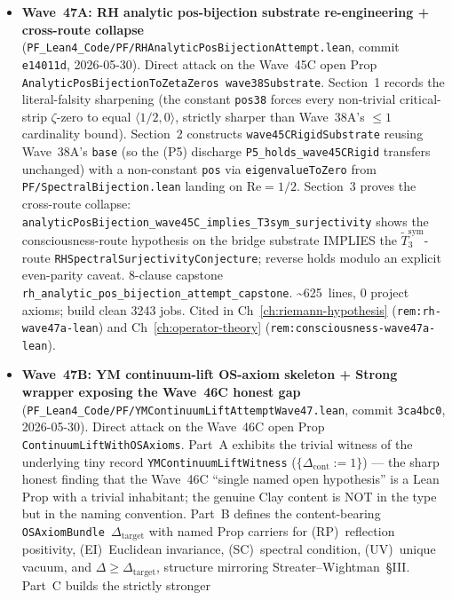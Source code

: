 \begin{itemize}
\item \textbf{Wave~47A: RH analytic pos-bijection substrate
  re-engineering + cross-route collapse}
  (\texttt{PF\_Lean4\_Code/PF/RHAnalyticPosBijectionAttempt.lean},
  commit \texttt{e14011d}, 2026-05-30). Direct attack on the
  Wave~45C open Prop \texttt{AnalyticPosBijectionToZetaZeros
  wave38Substrate}. Section~1 records the literal-falsity
  sharpening (the constant \texttt{pos38} forces every non-trivial
  critical-strip $\zeta$-zero to equal $\langle 1/2, 0\rangle$,
  strictly sharper than Wave~38A's $\leq 1$ cardinality bound).
  Section~2 constructs \texttt{wave45CRigidSubstrate} reusing
  Wave~38A's \texttt{base} (so the (P5) discharge
  \texttt{P5\_holds\_wave45CRigid} transfers unchanged) with a
  non-constant \texttt{pos} via \texttt{eigenvalueToZero} from
  \texttt{PF/SpectralBijection.lean} landing on $\mathrm{Re} = 1/2$.
  Section~3 proves the cross-route collapse:
  \texttt{analyticPosBijection\_wave45C\_implies\_T3sym\_surjectivity}
  shows the consciousness-route hypothesis on the bridge substrate
  IMPLIES the $\widetilde{T}_3^{\mathrm{sym}}$-route
  \texttt{RHSpectralSurjectivityConjecture}; reverse holds modulo
  an explicit even-parity caveat. 8-clause capstone
  \texttt{rh\_analytic\_pos\_bijection\_attempt\_capstone}.
  \textasciitilde 625~lines, 0 project axioms; build clean 3243 jobs.
  Cited in Ch~\ref{ch:riemann-hypothesis}
  (\texttt{rem:rh-wave47a-lean}) and Ch~\ref{ch:operator-theory}
  (\texttt{rem:consciousness-wave47a-lean}).
\item \textbf{Wave~47B: YM continuum-lift OS-axiom skeleton +
  Strong wrapper exposing the Wave~46C honest gap}
  (\texttt{PF\_Lean4\_Code/PF/YMContinuumLiftAttemptWave47.lean},
  commit \texttt{3ca4bc0}, 2026-05-30). Direct attack on the
  Wave~46C open Prop \texttt{ContinuumLiftWithOSAxioms}. Part~A
  exhibits the trivial witness of the underlying tiny record
  \texttt{YMContinuumLiftWitness} ($\{\Delta_{\mathrm{cont}} := 1\}$)
  --- the sharp honest finding that the Wave~46C ``single named
  open hypothesis'' is a Lean Prop with a trivial inhabitant; the
  genuine Clay content is NOT in the type but in the naming
  convention. Part~B defines the content-bearing
  \texttt{OSAxiomBundle $\Delta_{\mathrm{target}}$} with named Prop
  carriers for (RP)~reflection positivity, (EI)~Euclidean
  invariance, (SC)~spectral condition, (UV)~unique vacuum, and
  $\Delta \geq \Delta_{\mathrm{target}}$, structure mirroring
  Streater--Wightman~\S III. Part~C builds the strictly stronger

\end{itemize}
